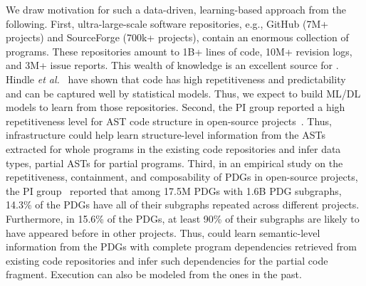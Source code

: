 


We draw motivation for such a data-driven, learning-based approach from the following. First, ultra-large-scale software repositories, e.g., GitHub (7M+ projects) and SourceForge (700k+ projects), contain an enormous collection of programs. These repositories amount to 1B+ lines of code, 10M+ revision logs, and 3M+ issue reports. This wealth of knowledge is an excellent source for {\tool}. Hindle {\em et al.}~\cite{naturalness-icse12} have shown that code has high repetitiveness and predictability and can be captured well by statistical models. Thus, we expect to build ML/DL models to learn from those repositories. 
Second, the PI group reported a high repetitiveness level for AST code structure in open-source projects~\cite{icse15}. Thus, {\tool} infrastructure could help learn structure-level information from the ASTs extracted for whole programs in the existing code repositories and infer data types, partial ASTs for partial programs. Third, in an empirical study on the repetitiveness, containment, and composability of PDGs in open-source projects, the PI group~\cite{msr16} reported that among 17.5M PDGs with 1.6B PDG subgraphs, 14.3\% of the PDGs have all of their subgraphs repeated across different projects. Furthermore, in 15.6\% of the PDGs, at least 90\% of their subgraphs are likely to have appeared before in other projects. 
Thus, {\tool} could learn semantic-level information from the PDGs with complete program dependencies retrieved from existing code repositories and infer such dependencies for the partial code fragment. Execution can also be modeled
from the ones in the past.


